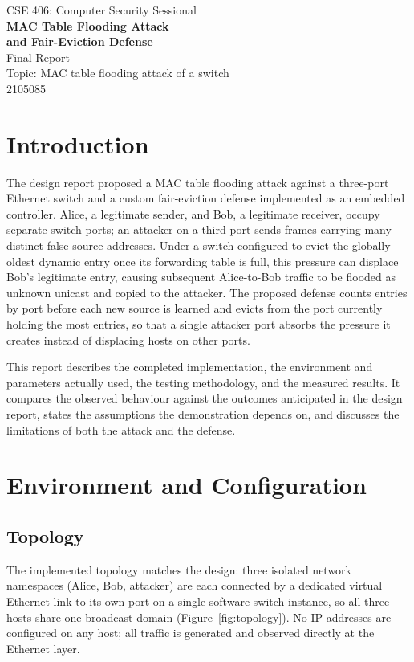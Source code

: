 \documentclass[10pt,a4paper]{article}
\begin{document}
\thispagestyle{plain}
\begin{center}
{\small CSE 406: Computer Security Sessional}\\[8pt]
{\LARGE\bfseries MAC Table Flooding Attack\\[3pt]
and Fair-Eviction Defense}\\[10pt]
{\large Final Report}\\[4pt]
Topic: MAC table flooding attack of a switch\\[10pt]
2105085 \quad{}\\[10pt]
\end{center}
\vspace{3pt}

\section{Introduction}
The design report proposed a MAC table flooding attack against a three-port Ethernet switch and a custom fair-eviction defense implemented as an embedded controller. Alice, a legitimate sender, and Bob, a legitimate receiver, occupy separate switch ports; an attacker on a third port sends frames carrying many distinct false source addresses. Under a switch configured to evict the globally oldest dynamic entry once its forwarding table is full, this pressure can displace Bob's legitimate entry, causing subsequent Alice-to-Bob traffic to be flooded as unknown unicast and copied to the attacker. The proposed defense counts entries by port before each new source is learned and evicts from the port currently holding the most entries, so that a single attacker port absorbs the pressure it creates instead of displacing hosts on other ports.

This report describes the completed implementation, the environment and parameters actually used, the testing methodology, and the measured results. It compares the observed behaviour against the outcomes anticipated in the design report, states the assumptions the demonstration depends on, and discusses the limitations of both the attack and the defense.

\section{Environment and Configuration}
\subsection{Topology}
The implemented topology matches the design: three isolated network namespaces (Alice, Bob, attacker) are each connected by a dedicated virtual Ethernet link to its own port on a single software switch instance, so all three hosts share one broadcast domain (Figure~\ref{fig:topology}). No IP addresses are configured on any host; all traffic is generated and observed directly at the Ethernet layer.
\end{document}

